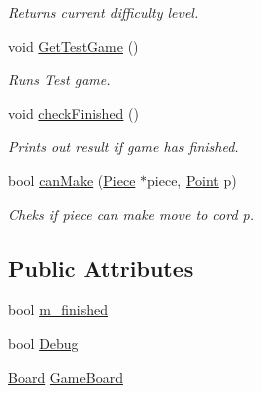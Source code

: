 \begin{DoxyCompactItemize}
\begin{DoxyCompactList}\small\item\em Returns current difficulty level. \end{DoxyCompactList}\item 
\hypertarget{class_game_a1f47238d93728540edb7940a80a9db89}{void \hyperlink{class_game_a1f47238d93728540edb7940a80a9db89}{Get\-Test\-Game} ()}\label{class_game_a1f47238d93728540edb7940a80a9db89}

\begin{DoxyCompactList}\small\item\em Runs Test game. \end{DoxyCompactList}\item 
\hypertarget{class_game_ae5be70ea28f2ec151cd93e86086f23a9}{void \hyperlink{class_game_ae5be70ea28f2ec151cd93e86086f23a9}{check\-Finished} ()}\label{class_game_ae5be70ea28f2ec151cd93e86086f23a9}

\begin{DoxyCompactList}\small\item\em Prints out result if game has finished. \end{DoxyCompactList}\item 
\hypertarget{class_game_a37edad1c1ded84b1735653f809ccb585}{bool \hyperlink{class_game_a37edad1c1ded84b1735653f809ccb585}{can\-Make} (\hyperlink{class_piece}{Piece} $\ast$piece, \hyperlink{struct_point}{Point} p)}\label{class_game_a37edad1c1ded84b1735653f809ccb585}

\begin{DoxyCompactList}\small\item\em Cheks if piece can make move to cord p. \end{DoxyCompactList}\end{DoxyCompactItemize}
\subsection*{Public Attributes}
\begin{DoxyCompactItemize}
\item 
bool \hyperlink{class_game_aee0b70deb19422d35b2061beb339bdf8}{m\-\_\-finished}
\item 
bool \hyperlink{class_game_ad79740c2d2fa299cf322bf6ea322d9aa}{Debug}
\item 
\hyperlink{class_board}{Board} \hyperlink{class_game_aeb67bc4fc06221330cfd7c862c85b66d}{Game\-Board}
\end{DoxyCompactItemize}
